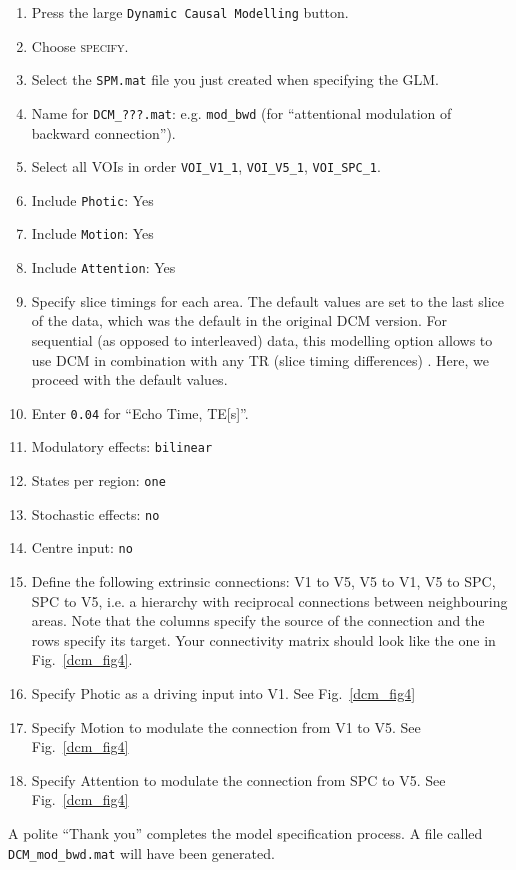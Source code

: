 \begin{enumerate}
\item Press the large \texttt{Dynamic Causal Modelling} button.
\item Choose \textsc{specify}.
\item Select the \texttt{SPM.mat} file you just created when specifying the GLM.
\item Name for \texttt{DCM\_???.mat}:  e.g. \texttt{mod\_bwd} (for ``attentional modulation of backward connection'').
\item Select all VOIs in order \texttt{VOI\_V1\_1}, \texttt{VOI\_V5\_1}, \texttt{VOI\_SPC\_1}.
\item Include \texttt{Photic}: Yes
\item Include \texttt{Motion}: Yes
\item Include \texttt{Attention}: Yes
\item Specify slice timings for each area. The default values are set to the last slice of the data, which was the default in the original DCM version. For sequential (as opposed to interleaved) data, this modelling option allows to use DCM in combination with any TR (slice timing differences) \cite{sjk_dcm_slicetiming}. Here, we proceed with the default values.
\item Enter \texttt{0.04} for ``Echo Time, TE[s]''.
\item Modulatory effects: \texttt{bilinear}
\item States per region: \texttt{one}
\item Stochastic effects: \texttt{no}
\item Centre input: \texttt{no}
\item Define the following extrinsic connections: V1 to V5, V5 to V1, V5 to SPC, SPC to V5, i.e. a hierarchy with reciprocal connections between neighbouring areas. Note that the columns specify the source of the connection and the rows specify its target. Your connectivity matrix should look like the one in Fig.~\ref{dcm_fig4}.
\item Specify Photic as a driving input into V1.  See Fig.~\ref{dcm_fig4}
\item Specify Motion to modulate the connection from V1 to V5.  See Fig.~\ref{dcm_fig4}
\item Specify Attention to modulate the connection from SPC to V5.  See Fig.~\ref{dcm_fig4}
\end{enumerate}
A polite ``Thank you'' completes the model specification process. A file called \texttt{DCM\_mod\_bwd.mat} will have been generated.


